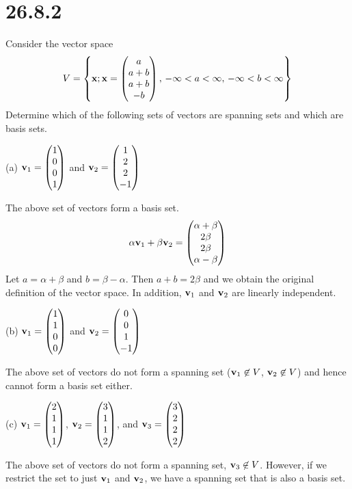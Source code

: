 \section*{26.8.2}
Consider the vector space
$$
V=\left\{
{\bf x}; {\bf x}=\left(\begin{matrix}
a\cr
a+b\cr
a+b\cr
-b
\end{matrix}\right),\,
-\infty<a<\infty,\,
-\infty<b<\infty
\right\}
$$
Determine which of the following sets of vectors are spanning sets
and which are basis sets.

\bigskip
\noindent
(a) ${\bf v}_1=\left(\begin{matrix}1\cr0\cr0\cr1\end{matrix}\right)$ and
${\bf v}_2=\left(\begin{matrix}1\cr2\cr2\cr-1\end{matrix}\right)$

\bigskip
\noindent
The above set of vectors form a basis set.
$$
\alpha{\bf v}_1+\beta{\bf v}_2=\left(\begin{matrix}
\alpha+\beta\cr
2\beta\cr
2\beta\cr
\alpha-\beta
\end{matrix}\right)
$$
Let $a=\alpha+\beta$ and $b=\beta-\alpha$.
Then $a+b=2\beta$ and we obtain the original definition
of the vector space.
In addition, ${\bf v}_1$ and ${\bf v}_2$ are linearly independent.

\bigskip
\noindent
(b) ${\bf v}_1=\left(\begin{matrix}1\cr1\cr0\cr0\end{matrix}\right)$ and
${\bf v}_2=\left(\begin{matrix}0\cr0\cr1\cr-1\end{matrix}\right)$

\bigskip
\noindent
The above set of vectors do not form a spanning set
(${\bf v}_1\not\in V$, ${\bf v}_2\not\in V$)
and hence cannot form a basis
set either.

\bigskip
\noindent
(c) 
${\bf v}_1=\left(\begin{matrix}2\cr1\cr1\cr1\end{matrix}\right)$,
${\bf v}_2=\left(\begin{matrix}3\cr1\cr1\cr2\end{matrix}\right)$, and
${\bf v}_3=\left(\begin{matrix}3\cr2\cr2\cr2\end{matrix}\right)$

\bigskip
\noindent
The above set of vectors do not form a spanning set, ${\bf v}_3\not\in V$.
However, if we restrict the set to just ${\bf v}_1$ and ${\bf v}_2$,
we have a spanning set that is also a basis set.

